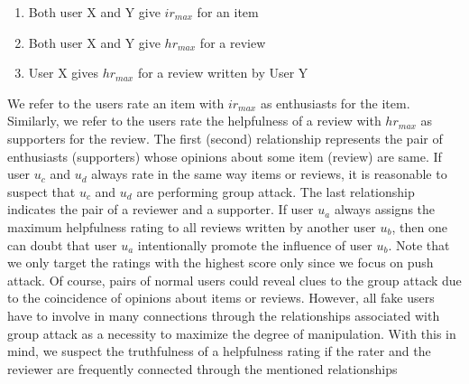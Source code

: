 \documentclass[master,english,final]{kaist-ucs}
\begin{document}
\begin{enumerate}
\item Both user X and Y give $ir_{max}$ for an item
\item Both user X and Y give $hr_{max}$ for a review
\item User X gives $hr_{max}$ for a review written by User Y
\end{enumerate}

We refer to the users rate an item with $ir_{max}$ as enthusiasts for the item.
Similarly, we refer to the users rate the helpfulness of a review with $hr_{max}$ as supporters for the review.
The first (second) relationship represents the pair of enthusiasts (supporters) whose opinions about some item (review) are same.
If user $u_c$ and $u_d$ always rate in the same way items or reviews, it is reasonable to suspect that $u_c$ and $u_d$ are performing group attack.
The last relationship indicates the pair of a reviewer and a supporter.
If user $u_a$ always assigns the maximum helpfulness rating to all reviews written by another user $u_b$, then one can doubt that user $u_a$ intentionally promote the influence of user $u_b$.
Note that we only target the ratings with the highest score only since we focus on push attack.
Of course, pairs of normal users could reveal clues to the group attack due to the coincidence of opinions about items or reviews.
However, all fake users have to involve in many connections through the relationships associated with group attack as a necessity to maximize the degree of manipulation.
With this in mind, we suspect the truthfulness of a helpfulness rating if the rater and the reviewer are frequently connected through the mentioned relationships
\end{document}
